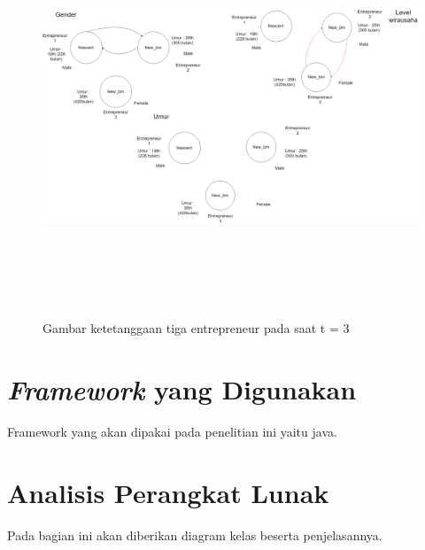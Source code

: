 	\begin{figure} [H]
		\centering  
		\includegraphics[width=18cm, height=12cm]{gambarwirausaha(t=3)} 
		\caption[Gambar ketetanggaan tiga entrepreneur pada saat t = 3]{Gambar ketetanggaan tiga entrepreneur pada saat t = 3} 
		\label{fig:t0} 
	\end{figure}
	
	
\section{\textit{Framework} yang Digunakan}
\label{framework}
Framework yang akan dipakai pada penelitian ini yaitu java.
	
	
\section{Analisis Perangkat Lunak}
\label{analisisPL}
Pada bagian ini akan diberikan diagram kelas beserta penjelasannya.


